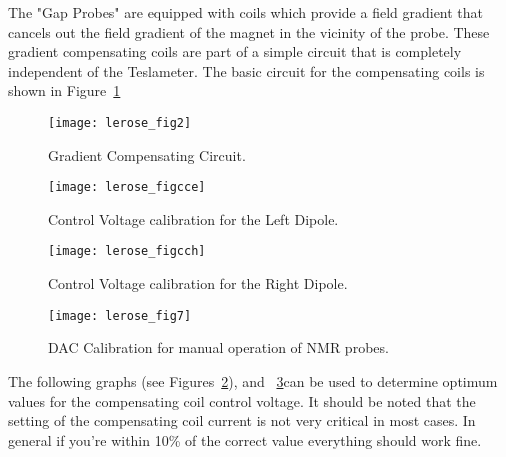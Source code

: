 { The "Gap Probes" are equipped with coils which provide a field 
gradient that cancels out the field gradient of the magnet in the vicinity of 
the probe.  These gradient compensating coils are part of a simple circuit 
that is completely independent of the Teslameter.  The basic circuit for 
the compensating coils is shown in Figure~\ref{fig:nmrcir}


\begin{figure}
\begin{center}
\texttt{[image: lerose\_fig2]}
{\linespread{1.}
\caption[Spectrometers: NMR Gradient Compensation]{Gradient Compensating Circuit.}
\label{fig:nmrcir}}
\end{center}
\end{figure}



\begin{figure}
\begin{center}
\texttt{[image: lerose\_figcce]}
{\linespread{1.}
\caption[Spectrometers: Control Voltage Calibration for Left Dipole]{Control Voltage calibration for the Left Dipole.}
\label{fig:nmrcomp4}}
\end{center}
\end{figure}

\begin{figure}
\begin{center}
\texttt{[image: lerose\_figcch]}
{\linespread{1.}
\caption[Spectrometers: Control Voltage Calibration for Right Dipole] {Control Voltage calibration for the Right Dipole.}
\label{fig:nmrcomp5}}
\end{center}
\end{figure}

\begin{figure}
\begin{center}
\texttt{[image: lerose\_fig7]}
{\linespread{1.}
\caption[Spectrometers: NMR Probe DAC Calibration]{DAC Calibration for manual operation of NMR probes.}
\label{fig:nmr_dac}}
\end{center}
\end{figure}

The following graphs (see Figures~\ref{fig:nmrcomp4}), 
and ~\ref{fig:nmrcomp5}can be used to determine optimum values for the 
compensating coil control voltage.  It should be noted that the setting 
of the compensating coil current is not very critical in most cases.  In 
general if you're within 10\% of the correct value everything should 
work fine.



}
